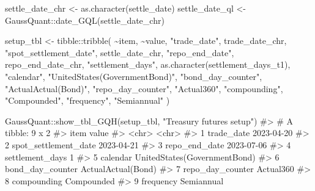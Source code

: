 \documentclass[
  letterpaper,
  DIV=11,
  numbers=noendperiod]{scrreprt}
\newenvironment{Shaded}{\begin{snugshade}}{\end{snugshade}}
\newcommand{\CommentTok}[1]{\textcolor[rgb]{0.37,0.37,0.37}{#1}}
\newcommand{\FunctionTok}[1]{\textcolor[rgb]{0.28,0.35,0.67}{#1}}
\newcommand{\NormalTok}[1]{\textcolor[rgb]{0.00,0.23,0.31}{#1}}
\newcommand{\OtherTok}[1]{\textcolor[rgb]{0.00,0.23,0.31}{#1}}
\newcommand{\SpecialCharTok}[1]{\textcolor[rgb]{0.37,0.37,0.37}{#1}}
\newcommand{\StringTok}[1]{\textcolor[rgb]{0.13,0.47,0.30}{#1}}
\begin{document}
\begin{Shaded}
\begin{Highlighting}[]
\NormalTok{settle\_date\_chr }\OtherTok{\textless{}{-}} \FunctionTok{as.character}\NormalTok{(settle\_date)}
\NormalTok{settle\_date\_ql }\OtherTok{\textless{}{-}}\NormalTok{ GaussQuant}\SpecialCharTok{::}\FunctionTok{date\_GQL}\NormalTok{(settle\_date\_chr)}

\NormalTok{setup\_tbl }\OtherTok{\textless{}{-}}\NormalTok{ tibble}\SpecialCharTok{::}\FunctionTok{tribble}\NormalTok{(}
  \SpecialCharTok{\textasciitilde{}}\NormalTok{item, }\SpecialCharTok{\textasciitilde{}}\NormalTok{value,}
  \StringTok{"trade\_date"}\NormalTok{, trade\_date\_chr,}
  \StringTok{"spot\_settlement\_date"}\NormalTok{, settle\_date\_chr,}
  \StringTok{"repo\_end\_date"}\NormalTok{, repo\_end\_date\_chr,}
  \StringTok{"settlement\_days"}\NormalTok{, }\FunctionTok{as.character}\NormalTok{(settlement\_days\_t1),}
  \StringTok{"calendar"}\NormalTok{, }\StringTok{"UnitedStates(GovernmentBond)"}\NormalTok{,}
  \StringTok{"bond\_day\_counter"}\NormalTok{, }\StringTok{"ActualActual(Bond)"}\NormalTok{,}
  \StringTok{"repo\_day\_counter"}\NormalTok{, }\StringTok{"Actual360"}\NormalTok{,}
  \StringTok{"compounding"}\NormalTok{, }\StringTok{"Compounded"}\NormalTok{,}
  \StringTok{"frequency"}\NormalTok{, }\StringTok{"Semiannual"}
\NormalTok{)}

\NormalTok{GaussQuant}\SpecialCharTok{::}\FunctionTok{show\_tbl\_GQH}\NormalTok{(setup\_tbl, }\StringTok{"Treasury futures setup"}\NormalTok{)}
\CommentTok{\#\textgreater{} \# A tibble: 9 x 2}
\CommentTok{\#\textgreater{}   item                 value                       }
\CommentTok{\#\textgreater{}   \textless{}chr\textgreater{}                \textless{}chr\textgreater{}                       }
\CommentTok{\#\textgreater{} 1 trade\_date           2023{-}04{-}20                  }
\CommentTok{\#\textgreater{} 2 spot\_settlement\_date 2023{-}04{-}21                  }
\CommentTok{\#\textgreater{} 3 repo\_end\_date        2023{-}07{-}06                  }
\CommentTok{\#\textgreater{} 4 settlement\_days      1                           }
\CommentTok{\#\textgreater{} 5 calendar             UnitedStates(GovernmentBond)}
\CommentTok{\#\textgreater{} 6 bond\_day\_counter     ActualActual(Bond)          }
\CommentTok{\#\textgreater{} 7 repo\_day\_counter     Actual360                   }
\CommentTok{\#\textgreater{} 8 compounding          Compounded                  }
\CommentTok{\#\textgreater{} 9 frequency            Semiannual}
\end{Highlighting}
\end{Shaded}
\end{document}
